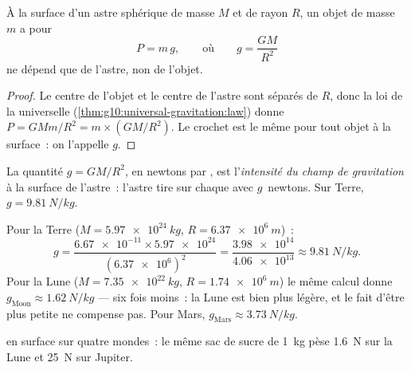 \begin{proposition}\label{prop:g10:universal-gravitation:surfaceg}
À la surface d'un astre sphérique de masse $M$ et de rayon $R$, un objet
de masse $m$ a pour 
\[
P = m\,g,
\qquad\text{où}\qquad
g = \frac{G M}{R^2}
\]
ne dépend que de l'astre, non de l'objet.
\end{proposition}

\begin{proof}
Le centre de l'objet et le centre de l'astre sont séparés de $R$, donc
la loi de la  universelle
(\cref{thm:g10:universal-gravitation:law}) donne
$P = G M m / R^2 = m \times \left(G M / R^2\right)$. Le crochet est le
même pour tout objet à la surface~: on l'appelle $g$.
\end{proof}

\begin{definition}\label{def:g10:universal-gravitation:fieldstrength}
La quantité $g = G M / R^2$, en newtons par , est
l'\emph{intensité du champ de gravitation} à la surface de l'astre~: l'astre tire sur chaque
 avec $g$~newtons. Sur Terre,
$g = \qty{9.81}{N/kg}$.
\end{definition}

\begin{example}[Calculer $g$]\label{ex:g10:universal-gravitation:gvalues}
Pour la Terre ($M = \qty{5.97e24}{kg}$, $R = \qty{6.37e6}{m}$)~:
\[
g = \frac{\num{6.67e-11} \times \num{5.97e24}}{(\num{6.37e6})^2}
= \frac{\num{3.98e14}}{\num{4.06e13}}
\approx \qty{9.81}{N/kg}.
\]
Pour la Lune ($M = \qty{7.35e22}{kg}$, $R = \qty{1.74e6}{m}$) le même
calcul donne $g_{\text{Moon}} \approx \qty{1.62}{N/kg}$ --- six fois
moins~: la Lune est bien plus légère, et le fait d'être plus petite ne
compense pas. Pour Mars, $g_{\text{Mars}} \approx \qty{3.73}{N/kg}$.
\end{example}

\begin{omfigure}

{\small {} en surface sur quatre
mondes~: le même sac de sucre de \qty{1}{kg} pèse \qty{1.6}{N} sur la
Lune et \qty{25}{N} sur Jupiter.}
\end{omfigure}

